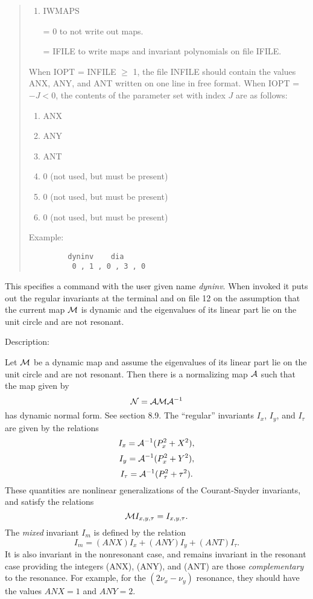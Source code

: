 \begin{quotation}
\begin{enumerate}
      \item  IWMAPS

             = 0 to not write out maps.

             = IFILE to write maps and invariant polynomials on file IFILE.
\end{enumerate}
When IOPT = INFILE $\geq$ 1, the file INFILE should contain the values
ANX, ANY, and
ANT written on one line in free format.  When IOPT = $-J < 0$, the contents
of the parameter set with index $J$ are as follows:
\begin{enumerate}
\item ANX
\item ANY
\item ANT
\item 0 (not used, but must be present)
\item 0 (not used, but must be present)
\item 0 (not used, but must be present)
\end{enumerate}

\vspace{5mm}
\noindent Example:
\begin{verbatim}
         dyninv    dia
          0 , 1 , 0 , 3 , 0
\end{verbatim}
\end{quotation}
This specifies a command with the user given name {\em dyninv}.  When invoked it puts out the regular invariants at the terminal and on file 12 on the assumption that the current map ${\cal M}$ is dynamic and the eigenvalues of its linear part lie on the unit circle and are not resonant.

\vspace{5mm}
     Description:
\vspace{2mm}

Let ${\cal M}$ be a dynamic map and assume the eigenvalues of its linear part lie on the unit circle and are not resonant.  Then there is a normalizing map ${\cal A}$ such that the map given by
\[
{\cal N} = {\cal A} {\cal M} {\cal A}^{-1}
\]
has dynamic normal form.  See section 8.9.  The ``regular'' invariants $I_x$, $I_y$, and $I_{\tau}$  are given by the relations
\[
I_x = {\cal A}^{-1} (P_x^2 + X^2),
\]
\[
I_y = {\cal A}^{-1} (P_x^2 + Y^2),
\]
\[
I_{\tau} = {\cal A}^{-1} (P_{\tau}^2 + \tau^2).
\]
These quantities are nonlinear generalizations of the Courant-Snyder invariants, and satisfy the relations 
\[
{\cal M} I_{x,y,\tau} = I_{x,y,\tau}.
\]
The {\em mixed} invariant $I_m$ is defined by the relation
\[
I_m = (ANX) I_x + (ANY) I_y + (ANT) I_{\tau}.
\]
It is also invariant in the nonresonant case, and remains invariant in the resonant case providing the integers (ANX), (ANY), and (ANT) are those {\em complementary} to the resonance.  For example, for the $(2 \nu_x - \nu_y)$ resonance, they should have the values $ANX = 1$ and $ANY = 2$.

